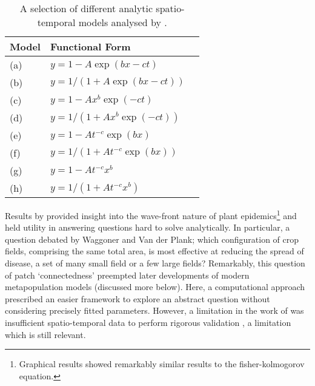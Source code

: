     \vspace{1em}
    \begin{table}[h]
    \centering
    \begin{tabular}{l l l}
    \hline
    \textbf{Model} & \textbf{Functional Form} \\
    \hline
    (a)  & $y = 1 - A\exp(bx - ct)$\\ 
    (b) & $y = 1/(1 + A\exp(bx - ct))$\\
    (c) & $y = 1 - Ax^{b}\exp(-ct)$ \\
    (d) & $y = 1/(1 + Ax^{b}\exp(-ct))$\\
    (e) & $y = 1 - At^{-c}\exp(bx)$\\
    (f) & $y = 1/(1 + At^{-c}\exp(bx))$\\
    (g) & $y = 1 - At^{-c}x^{b}$\\
    (h) & $y = 1/(1 + At^{-c}x^{b})$\\
    \hline
    \end{tabular}
    \caption{A selection of different analytic spatio-temporal models analysed by \cite{jeger1983analysing}.}
    \label{table:1}
    \end{table}
    
    Results by \cite{zadoks1977role} provided insight into the wave-front nature of plant epidemics\footnote{Graphical results showed remarkably similar results to the fisher-kolmogorov equation.} and held utility in answering questions hard to solve analytically. In particular, a question debated by Waggoner and Van der Plank; which configuration of crop fields, comprising the same total area, is most effective at reducing the spread of disease, a set of many small field or a few large fields? Remarkably, this question of patch `connectedness' preempted later developments of modern metapopulation models (discussed more below). Here, a computational approach prescribed an easier framework to explore an abstract question without considering precisely fitted parameters. However, a limitation in the work of  \cite{zadoks1977role} was insufficient spatio-temporal data to perform rigorous validation \cite{teng1981validation}, a limitation which is still relevant.\\
    
